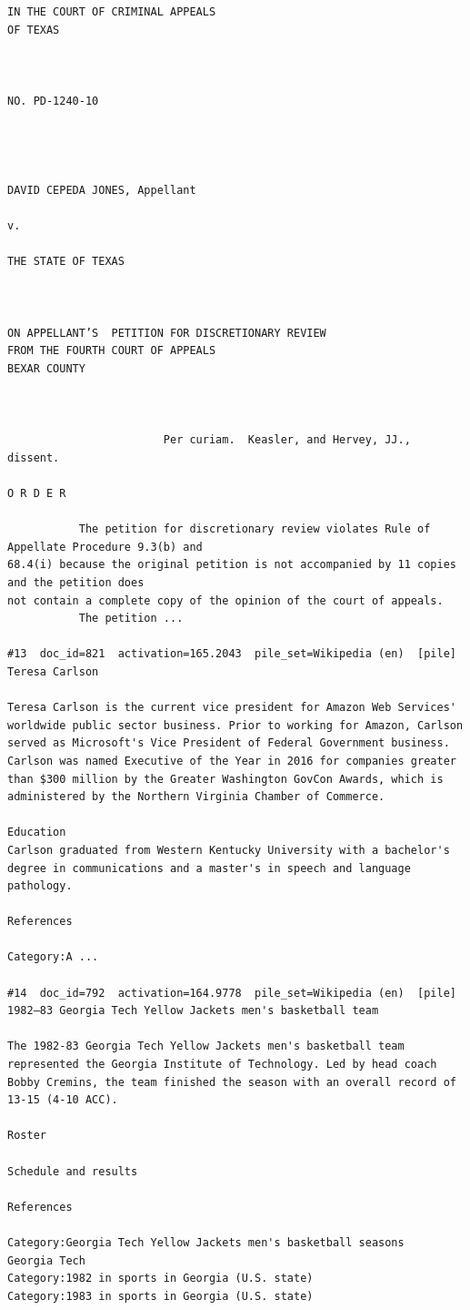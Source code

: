 \begin{verbatim}
IN THE COURT OF CRIMINAL APPEALS
OF TEXAS



NO. PD-1240-10




DAVID CEPEDA JONES, Appellant

v.

THE STATE OF TEXAS



ON APPELLANT’S  PETITION FOR DISCRETIONARY REVIEW
FROM THE FOURTH COURT OF APPEALS
BEXAR COUNTY



                        Per curiam.  Keasler, and Hervey, JJ., dissent.

O R D E R 

           The petition for discretionary review violates Rule of Appellate Procedure 9.3(b) and
68.4(i) because the original petition is not accompanied by 11 copies and the petition does
not contain a complete copy of the opinion of the court of appeals.
           The petition ...

#13  doc_id=821  activation=165.2043  pile_set=Wikipedia (en)  [pile]
Teresa Carlson

Teresa Carlson is the current vice president for Amazon Web Services' worldwide public sector business. Prior to working for Amazon, Carlson served as Microsoft's Vice President of Federal Government business. Carlson was named Executive of the Year in 2016 for companies greater than $300 million by the Greater Washington GovCon Awards, which is administered by the Northern Virginia Chamber of Commerce.

Education
Carlson graduated from Western Kentucky University with a bachelor's degree in communications and a master's in speech and language pathology.

References

Category:A ...

#14  doc_id=792  activation=164.9778  pile_set=Wikipedia (en)  [pile]
1982–83 Georgia Tech Yellow Jackets men's basketball team

The 1982-83 Georgia Tech Yellow Jackets men's basketball team represented the Georgia Institute of Technology. Led by head coach Bobby Cremins, the team finished the season with an overall record of 13-15 (4-10 ACC).

Roster

Schedule and results

References 

Category:Georgia Tech Yellow Jackets men's basketball seasons
Georgia Tech
Category:1982 in sports in Georgia (U.S. state)
Category:1983 in sports in Georgia (U.S. state)


\end{verbatim}
